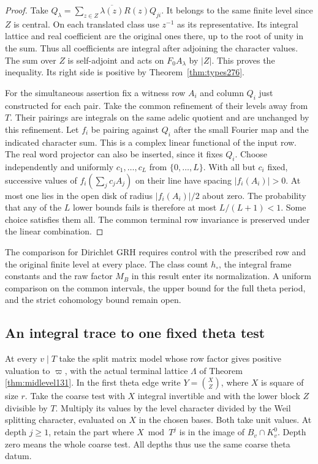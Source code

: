 \documentclass[a4paper,11pt]{article}
\theoremstyle{definition}
\theoremstyle{remark}
\numberwithin{equation}{section}
\begin{document}
\begin{proof}
Take \(Q_\lambda=\sum_{z\in Z}\overline{\lambda(z)}R(z)Q_{ji}\).
It belongs to the same finite level since \(Z\) is central.
On each translated class use \(z^{-1}\) as its representative.
Its integral lattice and real coefficient are the original
ones there, up to the root of unity in the sum. Thus all
coefficients are integral after adjoining the character values.
The sum over \(Z\) is self-adjoint and acts on \(F_0A_\lambda\)
by \(|Z|\). This proves the inequality. Its right side is
positive by Theorem~\ref{thm:types276}.

For the simultaneous assertion fix a witness row \(A_i\) and
column \(Q_i\) just constructed for each pair. Take the common
refinement of their levels away from \(T\). Their pairings are
integrals on the same adelic quotient and are unchanged by
this refinement. Let \(f_i\) be pairing against \(Q_i\) after
the small Fourier map and the indicated character sum. This
is a complex linear functional of the input row. The real
word projector can also be inserted, since it fixes \(Q_i\).
Choose independently and uniformly \(c_1,\ldots,c_L\) from
\(\{0,\ldots,L\}\). With all but \(c_i\) fixed, successive
values of \(f_i(\sum_j c_j A_j)\) on their line have spacing
\(|f_i(A_i)|>0\). At most one lies in the open disk of radius
\(|f_i(A_i)|/2\) about zero. The probability that any of the
\(L\) lower bounds fails is therefore at most \(L/(L+1)<1\).
Some choice satisfies them all. The common terminal row
invariance is preserved under the linear combination.
\end{proof}

The comparison for Dirichlet GRH requires control with the
prescribed row and the original finite level at every place.
The class count \(h_\circ\), the integral frame constants and
the raw factor \(M_B\) in this result enter its normalization.
A uniform comparison on the common intervals, the upper bound
for the full theta period, and the strict cohomology bound
remain open.

\subsection{An integral trace to one fixed theta test}\label{nav:VII-30}
At every \(v\mid T\) take the split matrix model whose row
factor gives positive valuation to \(\varpi\), with the actual
terminal lattice \(\Lambda\) of Theorem \ref{thm:midlevel131}. In
the first theta edge write
\(Y=\binom{X}{Z}\), where \(X\) is square of size \(r\).
Take the coarse test with \(X\) integral invertible and with
the lower block \(Z\) divisible by \(T\). Multiply its values
by the level character divided by the Weil splitting character,
evaluated on \(X\) in the chosen bases. Both take unit values.
At depth \(j\ge1\), retain the part where \(X\bmod T^j\) is
in the image of \(B_v\cap K_v^0\). Depth zero means the whole
coarse test. All depths thus use the same coarse theta datum.
\end{document}
